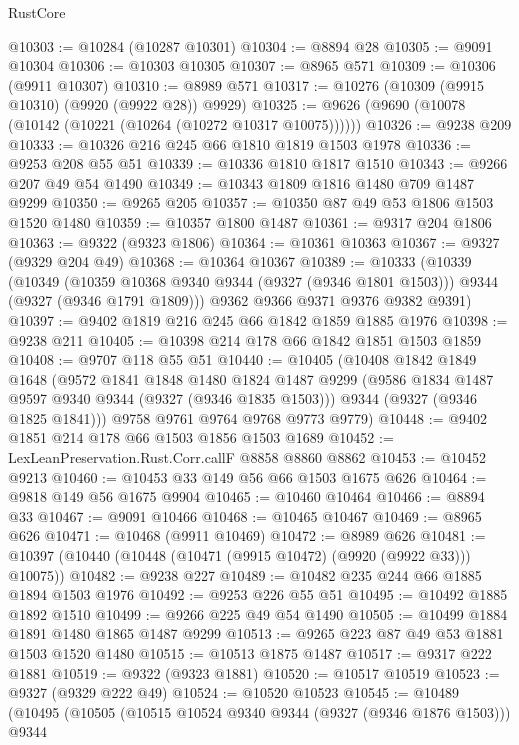 \begin{lexlean}{RustCore}
\begin{coremodule}
@10303 := @10284 (@10287 @10301)
@10304 := @8894 @28
@10305 := @9091 @10304
@10306 := @10303 @10305
@10307 := @8965 @571
@10309 := @10306 (@9911 @10307)
@10310 := @8989 @571
@10317 := @10276 (@10309 (@9915 @10310) (@9920 (@9922 @28)) @9929)
@10325 := @9626 (@9690 (@10078 (@10142 (@10221 (@10264 (@10272 @10317 @10075))))))
@10326 := @9238 @209
@10333 := @10326 @216 @245 @66 @1810 @1819 @1503 @1978
@10336 := @9253 @208 @55 @51
@10339 := @10336 @1810 @1817 @1510
@10343 := @9266 @207 @49 @54 @1490
@10349 := @10343 @1809 @1816 @1480 @709 @1487 @9299
@10350 := @9265 @205
@10357 := @10350 @87 @49 @53 @1806 @1503 @1520 @1480
@10359 := @10357 @1800 @1487
@10361 := @9317 @204 @1806
@10363 := @9322 (@9323 @1806)
@10364 := @10361 @10363
@10367 := @9327 (@9329 @204 @49)
@10368 := @10364 @10367
@10389 := @10333
    (@10339
      (@10349
        (@10359 @10368 @9340 @9344 (@9327 (@9346 @1801 @1503)))
        @9344
        (@9327 (@9346 @1791 @1809)))
      @9362
      @9366
      @9371
      @9376
      @9382
      @9391)
@10397 := @9402 @1819 @216 @245 @66 @1842 @1859 @1885 @1976
@10398 := @9238 @211
@10405 := @10398 @214 @178 @66 @1842 @1851 @1503 @1859
@10408 := @9707 @118 @55 @51
@10440 := @10405
    (@10408
      @1842
      @1849
      @1648
      (@9572
        @1841
        @1848
        @1480
        @1824
        @1487
        @9299
        (@9586 @1834 @1487 @9597 @9340 @9344 (@9327 (@9346 @1835 @1503)))
        @9344
        (@9327 (@9346 @1825 @1841)))
      @9758
      @9761
      @9764
      @9768
      @9773
      @9779)
@10448 := @9402 @1851 @214 @178 @66 @1503 @1856 @1503 @1689
@10452 := LexLeanPreservation.Rust.Corr.callF @8858 @8860 @8862
@10453 := @10452 @9213
@10460 := @10453 @33 @149 @56 @66 @1503 @1675 @626
@10464 := @9818 @149 @56 @1675 @9904
@10465 := @10460 @10464
@10466 := @8894 @33
@10467 := @9091 @10466
@10468 := @10465 @10467
@10469 := @8965 @626
@10471 := @10468 (@9911 @10469)
@10472 := @8989 @626
@10481 := @10397 (@10440 (@10448 (@10471 (@9915 @10472) (@9920 (@9922 @33))) @10075))
@10482 := @9238 @227
@10489 := @10482 @235 @244 @66 @1885 @1894 @1503 @1976
@10492 := @9253 @226 @55 @51
@10495 := @10492 @1885 @1892 @1510
@10499 := @9266 @225 @49 @54 @1490
@10505 := @10499 @1884 @1891 @1480 @1865 @1487 @9299
@10513 := @9265 @223 @87 @49 @53 @1881 @1503 @1520 @1480
@10515 := @10513 @1875 @1487
@10517 := @9317 @222 @1881
@10519 := @9322 (@9323 @1881)
@10520 := @10517 @10519
@10523 := @9327 (@9329 @222 @49)
@10524 := @10520 @10523
@10545 := @10489
    (@10495
      (@10505
        (@10515 @10524 @9340 @9344 (@9327 (@9346 @1876 @1503)))
        @9344

\end{coremodule}
\end{lexlean}
